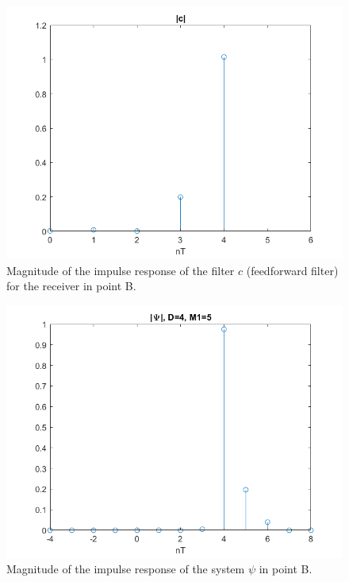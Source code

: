 \documentclass[a4paper,11.5pt]{article}
\begin{document}
\begin{figure}[H]
	\begin{center}   
		\includegraphics[width=\textwidth]{figs/B_c.png} 
		\caption{Magnitude of the impulse response of the filter $c$ (feedforward filter) for the receiver in point B.}
		\label{fig:B_c}
	\end{center}
\end{figure}

\begin{figure}[H]
	\begin{center}   
		\includegraphics[width=\textwidth]{figs/B_psi.png} 
		\caption{Magnitude of the impulse response of the system $\psi$ in point B.}
		\label{fig:B_psi}
	\end{center}
\end{figure}
\end{document}
